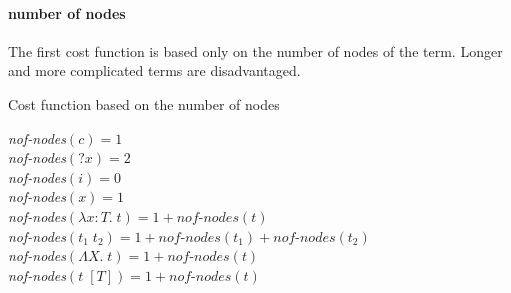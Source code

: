   \paragraph{number of nodes}
The first cost function is based only on the number of nodes of the term. Longer and more complicated terms are disadvantaged.
%
\begin{algorithm}
\caption{Cost function based on the number of nodes}

\textit{nof-nodes}$(c) = 1$\\
\textit{nof-nodes}$({?x}) = 2$\\
\textit{nof-nodes}$(i) = 0$\\
\textit{nof-nodes}$(x) = 1$\\
\textit{nof-nodes}$(\lambda x : T.\; t) = 1 + \textit{nof-nodes}(t)$\\
\textit{nof-nodes}$(t_1\; t_2) = 1 + \textit{nof-nodes}(t_1) + \textit{nof-nodes}(t_2)$\\
\textit{nof-nodes}$(\Lambda X.\; t) = 1 + \textit{nof-nodes}(t)$\\
\textit{nof-nodes}$(t\; [T]) = 1 + \textit{nof-nodes}(t)$\\

\end{algorithm} 
%
